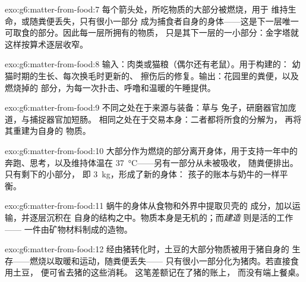 \begin{solution}{exo:g6:matter-from-food:7}
每个箭头处，所吃物质的大部分被燃烧，用于
维持生命，或随粪便丢失，只有很小一部分
成为捕食者自身的身体——这是下一层唯一
可取食的部分。因此每一层所拥有的物质，
只是其下一层的一小部分：金字塔就这样按算术逐层收窄。
\end{solution}

\begin{solution}{exo:g6:matter-from-food:8}
输入：肉类或猫粮（偶尔还有老鼠）。用于构建的：
幼猫时期的生长、每次换毛时更新的、
擦伤后的修复。输出：花园里的粪便，以及燃烧掉的
部分，为每一次扑击、呼噜和温暖的午睡提供。
\end{solution}

\begin{solution}{exo:g6:matter-from-food:9}
不同之处在于来源与装备：草与
兔子，研磨器官加庞道，与捕捉器官加短肠。
相同之处在于交易本身：二者都将所食的分解为，
再将其重建为自身的
物质。
\end{solution}

\begin{solution}{exo:g6:matter-from-food:10}
大部分作为燃烧的部分离开身体，用于支持一年中的
奔跑、思考，以及维持体温在
\qty{37}{\degreeCelsius}——另有一部分从未被吸收，
随粪便排出。只有剩下的小部分，
即 \qty{3}{kg}，形成了新的身体：
孩子的账本与奶牛的一样平衡。
\end{solution}

\begin{solution}{exo:g6:matter-from-food:11}
蜗牛的身体从食物和外界中提取贝壳的
成分，加以运输，并逐层沉积在
自身的结构之中。物质本身是无机的；而\emph{建造}
则是活的工作——
一件由矿物材料制成的造物。
\end{solution}

\begin{solution}{exo:g6:matter-from-food:12}
经由猪转化时，土豆的大部分物质被用于猪自身的
生存——燃烧以取暖和运动，随粪便丢失——
只有很小一部分化为猪肉。若直接食用土豆，
便可省去猪的这些消耗。
这笔差额记在了猪的账上，
而没有端上餐桌。
\end{solution}

